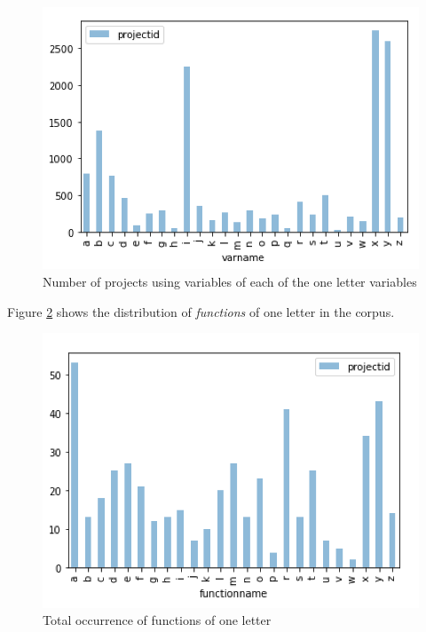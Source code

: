 \documentclass[conference]{IEEEtran}
\begin{document}
\begin{figure}[h]
	\begin{center}
		\includegraphics[width=\columnwidth]{fig/one_letter_occurrence}
		\caption{Number of projects using variables of each of the one letter variables}
		\label{fig:one_letter_occurrence}
	\end{center}
\end{figure} 

Figure \ref{fig:one_letter_occurrence_functions} shows the distribution of \emph{functions} of one letter in the corpus.

\begin{figure}[h]
	\begin{center}
		\includegraphics[width=\columnwidth]{fig/one_letter_occurrence_functions}
		\caption{Total occurrence of functions of one letter}
		\label{fig:one_letter_occurrence_functions}
	\end{center}
\end{figure} 
\end{document}
